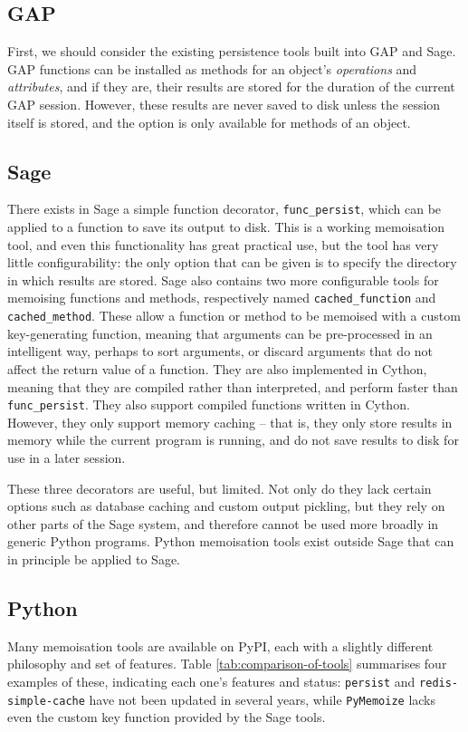 \documentclass{deliverablereport}
\begin{document}
\subsection{GAP}
First, we should consider the existing persistence tools built into GAP and
Sage.  GAP functions can be installed as methods for an object's
\emph{operations} and \emph{attributes}, and if they are, their results are
stored for the duration of the current GAP session.  However, these results are
never saved to disk unless the session itself is stored, and the option is only
available for methods of an object.

\subsection{Sage}
There exists in Sage a simple function decorator, \texttt{func\_persist}, which
can be applied to a function to save its output to disk.  This is a working
memoisation tool, and even this functionality has great practical use, but the
tool has very little configurability: the only option that can be given is to
specify the directory in which results are stored.  Sage also contains two more
configurable tools for memoising functions and methods, respectively named
\texttt{cached\_function} and \texttt{cached\_method}.  These allow a function
or method to be memoised with a custom key-generating function, meaning that
arguments can be pre-processed in an intelligent way, perhaps to sort arguments,
or discard arguments that do not affect the return value of a function.
They are also implemented in Cython, meaning that they are compiled
rather than interpreted, and perform
faster than \texttt{func\_persist}. They also support compiled functions written in
Cython.
However, they only support memory caching -- that is, they only store results in
memory while the current program is running, and do not save results to disk for
use in a later session.

These three decorators are useful, but limited.  Not only do they lack certain
options such as database caching and custom output pickling, but they rely on
other parts of the Sage system, and therefore cannot be used more broadly in
generic Python programs.  Python memoisation tools exist outside Sage that can
in principle be applied to Sage.

\subsection{Python}
Many memoisation tools are available on PyPI, each with a slightly different
philosophy and set of features.  Table \ref{tab:comparison-of-tools} summarises
four examples of these, indicating each one's features and status:
\texttt{persist} and \texttt{redis-simple-cache} have not been updated in
several years, while \texttt{PyMemoize} lacks even the custom key function
provided by the Sage tools.
\end{document}

